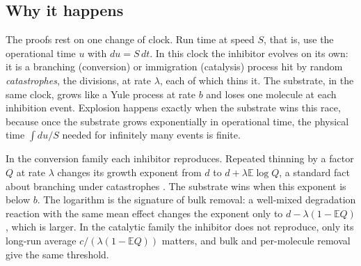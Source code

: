 \documentclass[11pt,a4paper]{article}
\numberwithin{equation}{section}
\theoremstyle{definition}\newtheorem{definition}[theorem]{Definition}
\theoremstyle{remark}\newtheorem{remark}[theorem]{Remark}\newtheorem{example}[theorem]{Example}
\newcommand{\E}{\mathbb E}
\begin{document}
\subsection{Why it happens}\label{sec:mechanism}
The proofs rest on one change of clock. Run time at speed $S$, that is, use the operational time $u$ with $du=S\,dt$. In this clock the inhibitor evolves on its own: it is a branching (conversion) or immigration (catalysis) process hit by random \emph{catastrophes}, the divisions, at rate $\lambda$, each of which thins it. The substrate, in the same clock, grows like a Yule process at rate $b$ and loses one molecule at each inhibition event. Explosion happens exactly when the substrate wins this race, because once the substrate grows exponentially in operational time, the physical time $\int du/S$ needed for infinitely many events is finite.

In the conversion family each inhibitor reproduces. Repeated thinning by a factor $Q$ at rate $\lambda$ changes its growth exponent from $d$ to $d+\lambda\E\log Q$, a standard fact about branching under catastrophes \cite{KaplanSudburyNilsen1975,HermannPfaffelhuber2020}. The substrate wins when this exponent is below $b$. The logarithm is the signature of bulk removal: a well-mixed degradation reaction with the same mean effect changes the exponent only to $d-\lambda(1-\E Q)$, which is larger. In the catalytic family the inhibitor does not reproduce, only its long-run average $c/(\lambda(1-\E Q))$ matters, and bulk and per-molecule removal give the same threshold.
\end{document}
